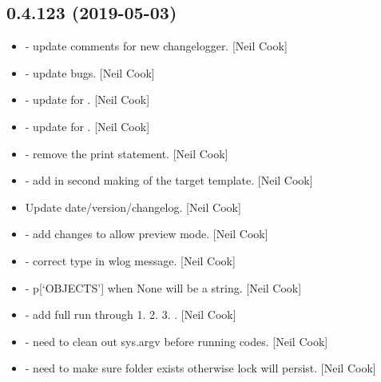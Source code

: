 \documentclass[a4paper,10pt,english]{report}
\begin{document}
\subsection{0.4.123 (2019-05-03)}
\label{\detokenize{misc/changelog:id137}}\begin{itemize}
\item {} 
 - update comments for new changelogger. {[}Neil Cook{]}

\item {} 
 - update bugs. {[}Neil Cook{]}

\item {} 
 - update for . {[}Neil Cook{]}

\item {} 
 - update for . {[}Neil Cook{]}

\item {} 
 - remove the print statement. {[}Neil Cook{]}

\item {} 
 - add in second making of the target template.
{[}Neil Cook{]}

\item {} 
Update date/version/changelog. {[}Neil Cook{]}

\item {} 
 - add changes to allow preview mode. {[}Neil Cook{]}

\item {} 
 - correct type in wlog message. {[}Neil Cook{]}

\item {} 
 - p{[}‘OBJECTS’{]} when None will be a string. {[}Neil
Cook{]}

\item {} 
 - add full run through 1.  2. 
3. . {[}Neil Cook{]}

\item {} 
 - need to clean out sys.argv before running codes.
{[}Neil Cook{]}

\item {} 
 - need to make sure folder exists otherwise lock will
persist. {[}Neil Cook{]}


\end{itemize}
\end{document}
